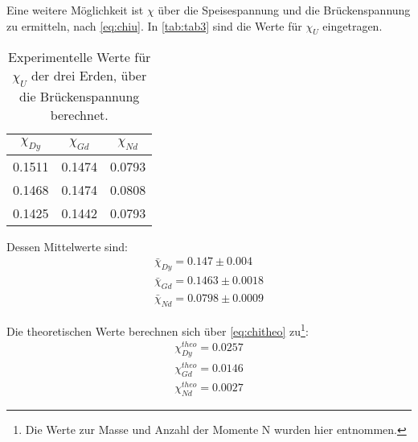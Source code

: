 Eine weitere Möglichkeit ist $\chi$ über die Speisespannung und die Brückenspannung zu ermitteln, nach \autoref{eq:chiu}.
In \autoref{tab:tab3} sind die Werte für $\chi_U$ eingetragen.

\begin{table}
  \centering
  \caption{Experimentelle Werte für $\chi_U$ der drei Erden, über die Brückenspannung berechnet.}
  \label{tab:tab3}
  \begin{tabular}{c|c|c}
    $\chi_{Dy}$ & $\chi_{Gd}$ & $\chi_{Nd}$\\
    \midrule
    0.1511 & 0.1474 & 0.0793\\
    0.1468 & 0.1474 & 0.0808\\
    0.1425 & 0.1442 & 0.0793\\
  \end{tabular}
\end{table}

Dessen Mittelwerte sind:
\begin{align*}
  \bar{\chi}_{Dy} = 0.147\pm 0.004\\
  \bar{\chi}_{Gd} = 0.1463\pm 0.0018\\
  \bar{\chi}_{Nd} = 0.0798\pm 0.0009
\end{align*}

Die theoretischen Werte berechnen sich über \autoref{eq:chitheo} zu\footnote[1]{Die Werte zur Masse und Anzahl der Momente N wurden hier\cite{v606} entnommen.}:
\begin{align*}
  \chi_{Dy}^{theo} = 0.0257\\
  \chi_{Gd}^{theo} = 0.0146\\
  \chi_{Nd}^{theo} = 0.0027
\end{align*}